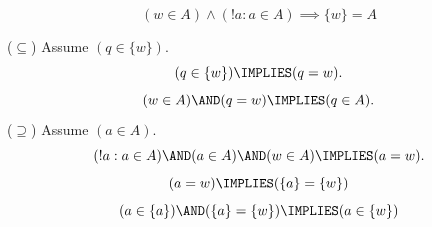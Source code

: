 \begin{theorem}
\[
(w\in A) \land (!a:a\in A) \implies \{w\}=A
\]
\end{theorem}
\Proof
\noindent($\subseteq$) Assume $(q\in \{w\})$.
\[
(q\in \{w\})\IMPLIES(q=w).
\]
\[
(w\in A)\AND(q=w)\IMPLIES(q\in A).
\]
\noindent($\supseteq$) Assume $(a\in A)$.
\[
(!a:a\in A)\AND(a\in A)\AND(w\in A)\IMPLIES(a=w).
\]
\[
(a=w)\IMPLIES(\{a\}=\{w\})
\]
\[
(a\in\{a\})\AND(\{a\}=\{w\})\IMPLIES(a\in\{w\})
\]
\Done

